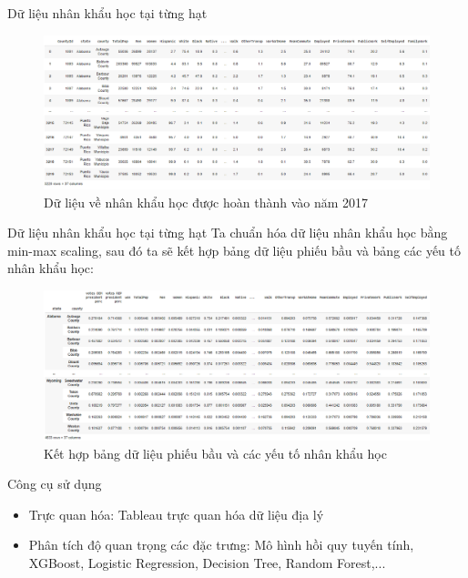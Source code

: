 \documentclass[10pt]{beamer}
\theoremstyle{remark}
\theoremstyle{definition}
\begin{document}
\begin{frame}{Dữ liệu nhân khẩu học tại từng hạt}
	\begin{figure}[h!]
        \centering
        \includegraphics[width=\textwidth]{figures/Census_Dataframe.png}
        \caption{Dữ liệu về nhân khẩu học được hoàn thành vào năm 2017}
    \end{figure}
\end{frame}

\begin{frame}{Dữ liệu nhân khẩu học tại từng hạt}
	Ta chuẩn hóa dữ liệu nhân khẩu học bằng min-max scaling, sau đó ta sẽ kết hợp bảng dữ liệu phiếu bầu và bảng các yếu tố nhân khẩu học:
    \begin{figure}[h!]
        \centering
        \includegraphics[width=\textwidth]{figures/President_Normalized_Demographic_Merged_Dataframe.png}
        \caption{Kết hợp bảng dữ liệu phiếu bầu và các yếu tố nhân khẩu học}
    \end{figure}
\end{frame}

\begin{frame}{Công cụ sử dụng}
    \begin{itemize}
        \item Trực quan hóa: Tableau trực quan hóa dữ liệu địa lý
        \item Phân tích độ quan trọng các đặc trưng: Mô hình hồi quy tuyến tính, XGBoost, Logistic Regression, Decision Tree, Random Forest,...
    \end{itemize}
\end{frame}
\end{document}
